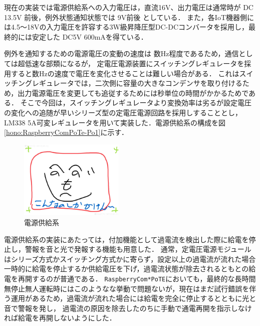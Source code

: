 現在の実装では電源供給系への入力電圧は，直流16V、出力電圧は通常時が DC 13.5V 前後，例外状態通知状態では 9V前後 としている．
また，各IoT機器側には4.5〜18Vの入力電圧を許容する3W級昇降圧型DC-DCコンバータを採用し，最終的には安定した DC5V 600mAを得ている．

例外を通知するための電源電圧の変動の速度は 数Hz程度であるため，通信としては超低速な部類になるが，
定電圧電源装置にスイッチングレギュレータを採用すると数Hzの速度で電圧を変化させることは難しい場合がある．
これはスイッチングレギュレータでは，二次側に容量の大きなコンデンサを取り付けるため，出力電源電圧を変更しても追従するためには秒単位の時間がかかるためである．
そこで今回は，スイッチングレギュレータより変換効率は劣るが設定電圧の変化への追随が早いシリーズ型の定電圧電源回路を採用しすることとし，LM338 5A可変レギュレータを用いて実装した．電源供給系の構成を図\ref{hono:RaspberryComPoTe-Po1}に示す．



\begin{figure}[H]
\centering
\includegraphics[width=5cm]{figspics/henoheno.jpeg}
\caption{電源供給系}
\label{hohno:RaspberryComPoTE-Po1}
\end{figure}



電源供給系の実装にあたっては，付加機能として過電流を検出した際に給電を停止し，警報を音と光で発報する機能も用意した．
通常，定電圧電源モジュールはシリーズ方式かスイッチング方式かに寄らず，設定以上の過電流が流れた場合一時的に給電を停止するか供給電圧を下げ，過電流状態が除去されるともとの給電を再開するのが普通である． {\tt Raspberry\-Com*PoTE}においても，最終的な長時間無停止無人運転時にはこのようなな挙動で問題ないが，現在はまだ試行錯誤を伴う運用があるため，過電流が流れた場合には給電を完全に停止するとともに光と音で警報を発し，
過電流の原因を除去したのちに手動で通電再開を指示しなければ給電を再開しないようにした．

